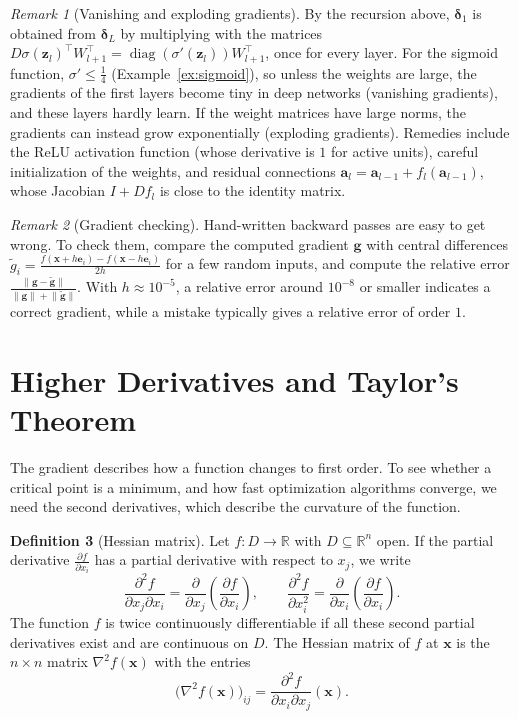 \documentclass[11pt]{article}
\newcommand{\norm}[1]{\lVert #1 \rVert}
\theoremstyle{definition}
\newtheorem{definition}{Definition}[section]
\theoremstyle{plain}
\theoremstyle{remark}
\newtheorem{remark}[definition]{Remark}
\DeclareMathOperator{\diag}{diag}
\begin{document}
\begin{remark}[Vanishing and exploding gradients]
    By the recursion above, $\boldsymbol{\delta}_1$ is obtained from $\boldsymbol{\delta}_L$ by multiplying with the matrices $D\sigma(\mathbf{z}_l)^\top W_{l+1}^\top = \diag(\sigma'(\mathbf{z}_l)) W_{l+1}^\top$, once for every layer. For the sigmoid function, $\sigma' \leq \frac{1}{4}$ (Example~\ref{ex:sigmoid}), so unless the weights are large, the gradients of the first layers become tiny in deep networks (vanishing gradients), and these layers hardly learn. If the weight matrices have large norms, the gradients can instead grow exponentially (exploding gradients). Remedies include the ReLU activation function (whose derivative is $1$ for active units), careful initialization of the weights, and residual connections $\mathbf{a}_l = \mathbf{a}_{l-1} + f_l(\mathbf{a}_{l-1})$, whose Jacobian $I + Df_l$ is close to the identity matrix.
\end{remark}

\begin{remark}[Gradient checking]
    Hand-written backward passes are easy to get wrong. To check them, compare the computed gradient $\mathbf{g}$ with central differences $\tilde{g}_i = \frac{f(\mathbf{x} + h\mathbf{e}_i) - f(\mathbf{x} - h\mathbf{e}_i)}{2h}$ for a few random inputs, and compute the relative error $\frac{\norm{\mathbf{g} - \tilde{\mathbf{g}}}}{\norm{\mathbf{g}} + \norm{\tilde{\mathbf{g}}}}$. With $h \approx 10^{-5}$, a relative error around $10^{-8}$ or smaller indicates a correct gradient, while a mistake typically gives a relative error of order $1$.
\end{remark}

\section{Higher Derivatives and Taylor's Theorem}\label{sec:hessian}

The gradient describes how a function changes to first order. To see whether a critical point is a minimum, and how fast optimization algorithms converge, we need the second derivatives, which describe the curvature of the function.

\begin{definition}[Hessian matrix]\label{def:hessian}
    Let $f: D \to \mathbb{R}$ with $D \subseteq \mathbb{R}^n$ open. If the partial derivative $\frac{\partial f}{\partial x_i}$ has a partial derivative with respect to $x_j$, we write
    \[\frac{\partial^2 f}{\partial x_j \partial x_i} = \frac{\partial}{\partial x_j}\left(\frac{\partial f}{\partial x_i}\right), \qquad \frac{\partial^2 f}{\partial x_i^2} = \frac{\partial}{\partial x_i}\left(\frac{\partial f}{\partial x_i}\right).\]
    The function $f$ is twice continuously differentiable if all these second partial derivatives exist and are continuous on $D$. The Hessian matrix of $f$ at $\mathbf{x}$ is the $n \times n$ matrix $\nabla^2 f(\mathbf{x})$ with the entries
    \[\big(\nabla^2 f(\mathbf{x})\big)_{ij} = \frac{\partial^2 f}{\partial x_i \partial x_j}(\mathbf{x}).\]
\end{definition}
\end{document}
